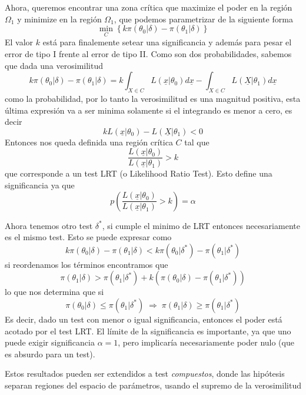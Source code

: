 \documentclass{article}
\numberwithin{equation}{section} %
\begin{document}
Ahora, queremos encontrar una zona crítica que maximize el poder en la región $\Omega_1$ y minimize en la región $\Omega_1$, que podemos parametrizar de la siguiente forma
\begin{equation}
\min_{C}\left\{k \pi(\theta_0|\delta) - \pi(\theta_1|\delta)\right\}
\end{equation} 
El valor $k$ está para finalemente setear una significancia y además para pesar el error de tipo I frente al error de tipo II. Como son dos probabilidades, sabemos que dada una verosimilitud
\[ k \pi(\theta_0|\delta) - \pi(\theta_1|\delta) = k \int_{X \in C} L(\underline{x}|\theta_0) d\underline{x} - \int_{X\in C} L(\underline{X}|\theta_1) d\underline{x}\]
como la probabilidad, por lo tanto la verosimilitud es una magnitud positiva, esta última expresión va a ser minima solamente si el integrando es menor a cero, es decir
\[k  L(\underline{x}|\theta_0) - L(\underline{X}|\theta_1) < 0\]
Entonces nos queda definida una región crítica $C$ tal que
\begin{equation}
\frac{L(\underline{x}|\theta_0)}{L(\underline{x}|\theta_1)} > k
\end{equation}
que corresponde a un test LRT (o Likelihood Ratio Test). Esto define una significancia ya que
\begin{equation}
p\left( \frac{L(\underline{x}|\theta_0)}{L(\underline{x}|\theta_1)} > k \right) = \alpha
\end{equation}

Ahora tenemos otro test $\delta^*$, si cumple el minimo de LRT entonces necesariamente es el mismo test. Esto se puede expresar como
\[ k \pi(\theta_0|\delta) - \pi(\theta_1|\delta) < k \pi(\theta_0|\delta^*) - \pi(\theta_1|\delta^*)\]
si reordenamos los términos encontramos que
\[ \pi(\theta_1|\delta) > \pi(\theta_1|\delta^{*}) + k( \pi(\theta_0|\delta) - \pi(\theta_1|\delta^{*})) \]
lo que nos determina que si
\begin{equation}
\pi(\theta_0|\delta) \leq \pi(\theta_1|\delta^{*}) \; \Rightarrow \; \pi(\theta_1|\delta) \geq \pi(\theta_1|\delta^{*})
\end{equation}
Es decir, dado un test con menor o igual significancia, entonces el poder está acotado por el test LRT. El límite de la significancia es importante, ya que uno puede exigir significancia $\alpha = 1$, pero implicaría necesariamente poder nulo (que es absurdo para un test).

Estos resultados pueden ser extendidos a test \emph{compuestos}, donde las hipótesis separan regiones del espacio de parámetros, usando el supremo de la verosimilitud
\end{document}
